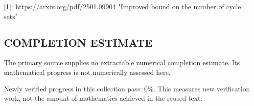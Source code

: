 [1]: https://arxiv.org/pdf/2501.09904 "Improved bound on the number of cycle sets"


\subsection*{COMPLETION ESTIMATE}
The primary source supplies no extractable numerical completion estimate. Its mathematical progress is not numerically assessed here.

Newly verified progress in this collection pass: $0\%$. This measures new verification work, not the amount of mathematics achieved in the reused text.

